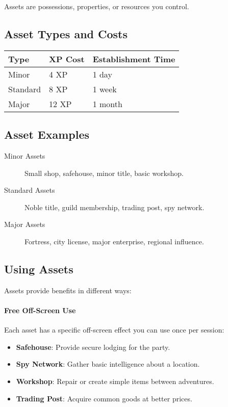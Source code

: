 Assets are possessions, properties, or resources you control.

\subsection*{Asset Types and Costs}
\begin{center}
\small
\begin{tabular}{lll}
\toprule
\textbf{Type} & \textbf{XP Cost} & \textbf{Establishment Time} \\
\midrule
Minor   & 4 XP  & 1 day \\
Standard& 8 XP  & 1 week \\
Major   & 12 XP & 1 month \\
\bottomrule
\end{tabular}
\end{center}

\subsection*{Asset Examples}
\begin{description}
\item[Minor Assets] Small shop, safehouse, minor title, basic workshop.
\item[Standard Assets] Noble title, guild membership, trading post, spy network.
\item[Major Assets] Fortress, city license, major enterprise, regional influence.
\end{description}

\subsection*{Using Assets}
Assets provide benefits in different ways:

\paragraph{Free Off-Screen Use}
Each asset has a specific off-screen effect you can use once per session:
\begin{itemize}
\item \textbf{Safehouse}: Provide secure lodging for the party.
\item \textbf{Spy Network}: Gather basic intelligence about a location.
\item \textbf{Workshop}: Repair or create simple items between adventures.
\item \textbf{Trading Post}: Acquire common goods at better prices.
\end{itemize}

